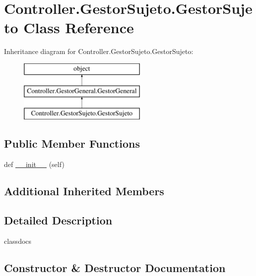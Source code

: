 \hypertarget{class_controller_1_1_gestor_sujeto_1_1_gestor_sujeto}{}\section{Controller.\+Gestor\+Sujeto.\+Gestor\+Sujeto Class Reference}
\label{class_controller_1_1_gestor_sujeto_1_1_gestor_sujeto}
Inheritance diagram for Controller.\+Gestor\+Sujeto.\+Gestor\+Sujeto\+:\begin{figure}[H]
\begin{center}
\leavevmode
\includegraphics[height=3.000000cm]{class_controller_1_1_gestor_sujeto_1_1_gestor_sujeto}
\end{center}
\end{figure}
\subsection*{Public Member Functions}
\begin{DoxyCompactItemize}
\item 
def \hyperlink{class_controller_1_1_gestor_sujeto_1_1_gestor_sujeto_af03120d2a26ad27cf43979b059065818}{\+\_\+\+\_\+init\+\_\+\+\_\+} (self)
\end{DoxyCompactItemize}
\subsection*{Additional Inherited Members}


\subsection{Detailed Description}
\begin{DoxyVerb}classdocs
\end{DoxyVerb}
 

\subsection{Constructor \& Destructor Documentation}
\mbox{\label{class_controller_1_1_gestor_sujeto_1_1_gestor_sujeto_af03120d2a26ad27cf43979b059065818}} 
